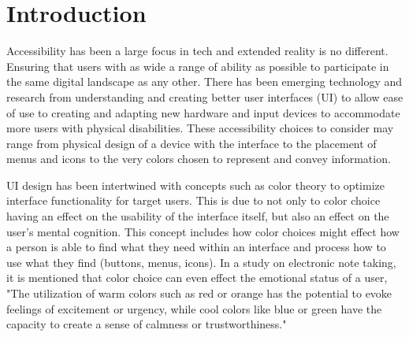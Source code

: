 \documentclass[acmlarge]{acmart}
\begin{document}


\maketitle

\section{Introduction}
Accessibility has been a large focus in tech and extended reality is no different. Ensuring that users
with as wide a range of ability as possible to participate in the same digital landscape as any other. There has been emerging technology and research from
understanding and creating better user interfaces (UI) to allow ease of use to creating and adapting new hardware and input devices to accommodate more 
users with physical disabilities. These accessibility choices to consider may range from physical design of a device with the interface to the placement of menus
and icons to the very colors chosen to represent and convey information.

UI design has been intertwined with concepts such as color theory to optimize interface functionality for target users. This is due to not only to color
choice having an effect on the usability of the interface itself, but also an effect on the user's mental cognition. This concept includes how color choices might effect
how a person is able to find what they need within an interface and process how to use what they find (buttons, menus, icons). In a study on electronic note taking, it is mentioned
that color choice can even effect the emotional status of a user, "The utilization of warm colors such as red or orange has the potential to evoke feelings of excitement
or urgency, while cool colors like blue or green have the capacity to create a sense of calmness or trustworthiness." \cite{huang2024enhancing}
\end{document}
